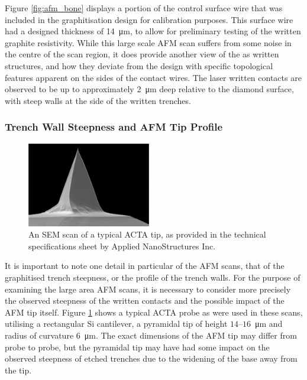 \begin{refsection}
Figure \ref{fig:afm_bone} displays a portion of the control surface wire that was included in the graphitisation design for calibration purposes. This surface wire had a designed thickness of 14~\si{\micro\metre}, to allow for preliminary testing of the written graphite resistivity. While this large scale AFM scan suffers from some noise in the centre of the scan region, it does provide another view of the as written structures, and how they deviate from the design with specific topological features apparent on the sides of the contact wires. The laser written contacts are observed to be up to approximately 2~\si{\micro\metre} deep relative to the diamond surface, with steep walls at the side of the written trenches.
\clearpage
\subsubsection{Trench Wall Steepness and AFM Tip Profile}
\label{subsubsec:trench_wall_steepness}

\begin{figure} %
  \centering
  \includegraphics[width=0.48\textwidth]{Chapter7/Figs/Raster/ACTA tip.png}
  \caption{An SEM scan of a typical ACTA tip, as provided in the technical specifications sheet by Applied NanoStructures Inc.}
  \label{fig:acta_tip}
\end{figure}

It is important to note one detail in particular of the AFM scans, that of the graphitised trench steepness, or the profile of the trench walls. For the purpose of examining the large area AFM scans, it is necessary to consider more precisely the observed steepness of the written contacts and the possible impact of the AFM tip itself. Figure \ref{fig:acta_tip} shows a typical ACTA probe as were used in these scans, utilising a rectangular Si cantilever, a pyramidal tip of height $14$--$16$~\si{\micro\metre} and radius of curvature $6$~\si{\micro\metre}. The exact dimensions of the AFM tip may differ from probe to probe, but the pyramidal tip may have had some impact on the observed steepness of etched trenches due to the widening of the base away from the tip.


\end{refsection}
